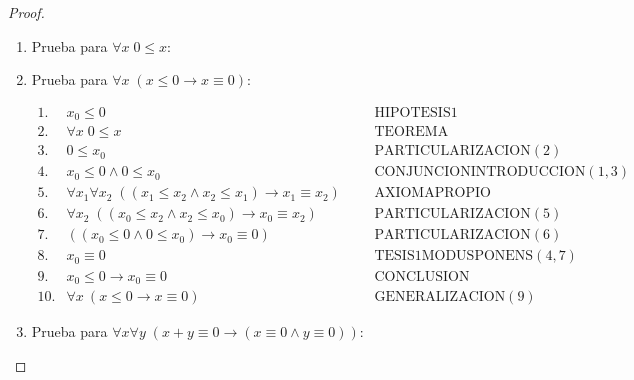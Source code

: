   \begin{proof}
    \begin{enumerate}[(1)]
      \item Prueba para $\forall x \; 0 \leq x$:

      \item Prueba para $\forall x \; (x \leq 0 \rightarrow x \equiv 0)$:

        $\begin{array}{lllll}
          1. & x_{0} \leq 0 &&& \text{HIPOTESIS}1 \\
          2. & \forall x \; 0 \leq x &&& \text{TEOREMA} \\
          3. & 0 \leq x_{0} &&& \text{PARTICULARIZACION}(2) \\
          4. & x_{0} \leq 0 \wedge 0 \leq x_{0} &&& \text{CONJUNCIONINTRODUCCION}(1,3) \\
          5. & \forall x_{1} \forall x_{2} \; ((x_{1} \leq x_{2} \wedge x_{2} \leq x_{1}) \rightarrow x_{1} \equiv
            x_{2}) &&& \text{AXIOMAPROPIO} \\
          6. & \forall x_{2} \; ((x_{0} \leq x_{2} \wedge x_{2} \leq x_{0}) \rightarrow x_{0} \equiv x_{2}) &&&
            \text{PARTICULARIZACION}(5) \\
          7. & ((x_{0}\leq 0\wedge 0\leq x_{0})\rightarrow x_{0}\equiv 0) &&& \text{PARTICULARIZACION}(6) \\
          8. & x_{0}\equiv 0 &&& \text{TESIS}1\text{MODUSPONENS}(4,7) \\
          9. & x_{0}\leq 0\rightarrow x_{0}\equiv 0 &&& \text{CONCLUSION} \\
          10. & \forall x\ (x\leq 0\rightarrow x\equiv 0) &&& \text{GENERALIZACION} (9)
        \end{array}$

        \item Prueba para $\forall x \forall y \; (x + y \equiv 0 \rightarrow (x \equiv 0 \wedge y \equiv 0))$:


\end{enumerate}
\end{proof}
